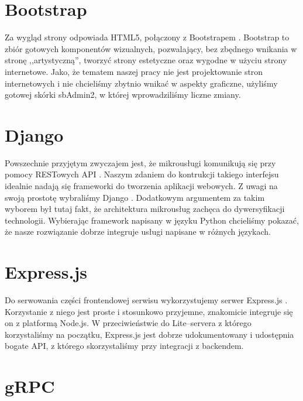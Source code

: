 \documentclass[licencjacka]{pracamgr}
\begin{document}
\section{Bootstrap}

Za wygląd strony odpowiada HTML5, połączony z Bootstrapem \cite{bootstrap}.
Bootstrap to zbiór gotowych komponentów wizualnych, pozwalający, bez zbędnego wnikania
w stronę ,,artystyczną'', tworzyć strony estetyczne oraz wygodne w użyciu strony internetowe.
Jako, że tematem naszej pracy nie jest projektowanie stron internetowych i nie chcieliśmy zbytnio wnikać w aspekty graficzne,
użyliśmy gotowej skórki sbAdmin2, w której wprowadziliśmy liczne zmiany.

\section{Django}

Powszechnie przyjętym zwyczajem jest, że mikrousługi komunikują się przy pomocy
RESTowych API \cite{mammatustech}. Naszym zdaniem do kontrukcji takiego interfejsu
idealnie nadają się frameworki do tworzenia aplikacji webowych. Z uwagi na swoją
prostotę wybraliśmy Django \cite{django}. Dodatkowym argumentem za takim wyborem był tutaj fakt,
że architektura mikrousług zachęca do dywersyfikacji technologii. Wybierając
framework napisany w języku Python chcieliśmy pokazać, że nasze rozwiązanie dobrze
integruje usługi napisane w różnych językach.

\section{Express.js}

Do serwowania części frontendowej serwisu wykorzystujemy serwer Express.js \cite{expressjs}.
Korzystanie z niego jest proste i stosunkowo przyjemne, znakomicie integruje się
on z platformą Node.js. W przeciwieństwie do Lite--servera z którego korzystaliśmy
na początku, Express.js jest dobrze udokumentowany i udostępnia bogate API, z którego
skorzystaliśmy przy integracji z backendem.

\section{gRPC}
\end{document}

